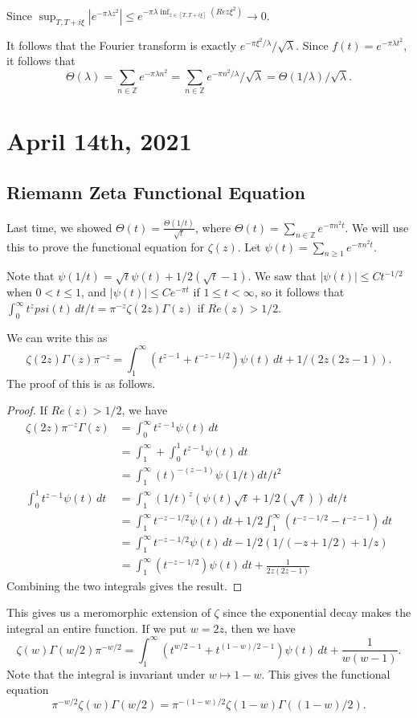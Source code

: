 \documentclass[12pt]{scrartcl}
\newcommand{\Z}{\mathbb{Z}}
\begin{document}
Since $\sup_{T, T + i \xi} |e^{- \pi \lambda z^2}| \le e^{- \pi \lambda\inf_{z \in [T, T + i \xi]} (Re z\xi^2)} \to 0.$

It follows that the Fourier transform is exactly $e^{-\pi \xi^2/\lambda}/\sqrt{\lambda}$.  Since $f(t) = e^{-\pi \lambda t^2}$, it follows that 
$$\Theta(\lambda) = \sum_{n \in \Z} e^{- \pi \lambda n^2} = \sum_{n \in \Z} e^{- \pi n^2/\lambda}/\sqrt{\lambda} = \Theta(1/\lambda)/\sqrt{\lambda}.$$
\pagebreak
\section{April 14th, 2021}
\subsection{Riemann Zeta Functional Equation}
Last time, we showed $\Theta(t) = \frac{\Theta(1/t)}{\sqrt{t}}$, where $\Theta(t) = \sum_{n \in \Z} e^{- \pi n^2 t}$.  We will use this to prove the functional equation for $\zeta(z)$.  Let $\psi(t) = \sum_{n \ge 1} e^{- \pi n^2 t}$.

Note that $\psi(1/t) = \sqrt{t} \psi(t) + 1/2(\sqrt{t} - 1)$.  We saw that $|\psi(t)| \le C t^{-1/2}$ when $0 < t \le 1$, and $|\psi(t)| \le C e^{- \pi t}$ if $1 \le t < \infty$, so it follows that $\int_0^\infty t^z psi(t)\,dt/t = \pi^{-z} \zeta(2z)\Gamma(z)$ if $Re(z) > 1/2$.

We can write this as 
$$\zeta(2z) \Gamma(z) \pi^{-z} = \int_1^\infty (t^{z-1} + t^{-z - 1/2}) \psi(t)\,dt + 1/(2z(2z-1)).$$
The proof of this is as follows.
\begin{proof}
If $Re(z) > 1/2$, we have
\begin{align*}
\zeta(2z) \pi^{-z}\Gamma(z) &= \int_0^\infty t^{z-1} \psi(t)\,dt\\
&= \int_1^\infty + \int_{0}^1 t^{z-1} \psi(t)\,dt \\
&= \int_1^\infty (t)^{-(z-1)} \psi(1/t) dt/t^2 \\
\int_0^1 t^{z-1} \psi(t)\,dt &= \int_1^\infty (1/t)^z(\psi(t) \sqrt{t} + 1/2(\sqrt{t})) \,dt/t \\
&= \int_1^\infty t^{-z-1/2} \psi(t)\,dt + 1/2\int_1^\infty (t^{-z-1/2} - t^{-z-1}) \,dt \\
&= \int_1^\infty t^{-z-1/2} \psi(t)\,dt - 1/2(1/(-z + 1/2) + 1/z) \\
&= \int_1^\infty (t^{-z-1/2})\psi(t) \,dt + \frac{1}{2z(2z-1)}
\end{align*} 
Combining the two integrals gives the result.  
\end{proof}
This gives us a meromorphic extension of $\zeta$ since the exponential decay makes the integral an entire function.  If we put $w = 2z$, then we have
$$\zeta(w) \Gamma(w/2) \pi^{-w/2} = \int_1^\infty (t^{w/2 - 1} + t^{(1-w)/2 - 1}) \psi(t) \,dt + \frac{1}{w(w-1)}.$$
Note that the integral is invariant under $w \mapsto 1 - w$.  This gives the functional equation
$$\pi^{-w/2} \zeta(w)\Gamma(w/2) = \pi^{-(1-w)/2} \zeta(1-w) \Gamma((1-w)/2).$$
\end{document}
